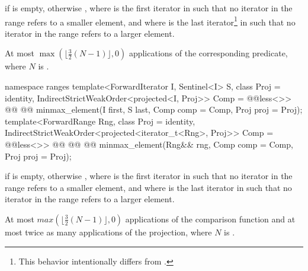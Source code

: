 \begin{itemdescr}
\pnum
\returns
{} if  is empty, otherwise
, where  is
the first iterator in  such that no iterator in the range refers
to a smaller element, and where  is the last iterator\footnote{This behavior
intentionally differs from .}
in  such that no iterator in the range refers to a larger element.

\pnum
\complexity
At most
$\max(\bigl\lfloor{\frac{3}{2}} (N-1)\bigr\rfloor, 0)$
applications of the corresponding predicate, where $N$ is .
\end{itemdescr}

\begin{addedblock}
%
\begin{itemdecl}
namespace ranges {
  template<ForwardIterator I, Sentinel<I> S, class Proj = identity,
      IndirectStrictWeakOrder<projected<I, Proj>> Comp = @@less<>>
    @@
    @@
      minmax_element(I first, S last, Comp comp = Comp{}, Proj proj = Proj{});
  template<ForwardRange Rng, class Proj = identity,
      IndirectStrictWeakOrder<projected<iterator_t<Rng>, Proj>> Comp = @@less<>>
    @@
                @@
    @@
      minmax_element(Rng&& rng, Comp comp = Comp{}, Proj proj = Proj{});
}
\end{itemdecl}

\begin{itemdescr}
\pnum
\returns
{} if  is empty, otherwise
, where  is
the first iterator in  such that no iterator in the range refers to a smaller
element, and where  is the last iterator in  such that no iterator
in the range refers to a larger element.

\pnum
\complexity
At most
$max(\lfloor{\frac{3}{2}} (N-1)\rfloor, 0)$
applications of the comparison function and
at most twice as many applications of the projection,
where $N$ is .
\end{itemdescr}
\end{addedblock}

